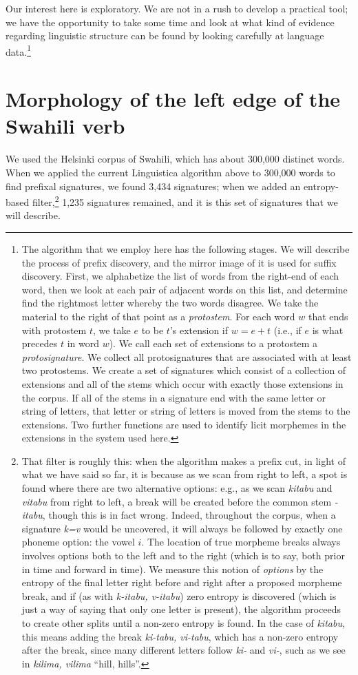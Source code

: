 \documentclass[output=paper,colorlinks,citecolor=brown]{langscibook}
\begin{document}
Our interest here is exploratory. We are not in a rush to develop a practical tool; we have the opportunity to take some time and look at what kind of evidence regarding linguistic structure can be found by looking carefully at language data.\footnote{The algorithm that we employ here has the following stages. We will describe the process of prefix discovery, and the mirror image of it is used for suffix discovery. First, we alphabetize the list of words from the right-end of each word, then we look at each pair of adjacent words on this list, and determine find the rightmost letter whereby the two words disagree. We take the material to the right of that point as a \textit{protostem}. For each word $w$ that ends with protostem $t$, we take $e$ to be $t$'s extension if $w=e+t$ (i.e., if $e$ is what precedes $t$ in word $w$). We call each set of extensions to a protostem a \textit{protosignature}. We collect all protosignatures that are associated with at least two protostems. We create a set of signatures which consist of a collection of extensions and all of the stems which occur with exactly those extensions in the corpus. If all of the stems in a signature end with the same letter or string of letters, that letter or string of letters is moved from the stems to the extensions. Two further functions are used to identify licit morphemes in the extensions in the system used here.}


\section{Morphology of the left edge of the Swahili verb}

We used the Helsinki corpus of Swahili, which has about 300,000 distinct words. When we applied the current Linguistica algorithm above to 300,000 words to find prefixal signatures, we found 3,434 signatures; when we added an entropy-based filter,\footnote{That filter is roughly this: when the algorithm makes a prefix cut, in light of what we have said so far, it is because as we scan from right to left, a spot is found where there are two alternative options: e.g., as we scan \textit{kitabu} and \textit{vitabu} from right to left, a break will be created before {the common stem \textit{-itabu}, though this is in fact wrong. Indeed, throughout the corpus, when a signature \textit{k=v} would be uncovered, it will always be followed by exactly one phoneme option: the vowel $i$. The location of true morpheme breaks always involves options both to the left and to the right (which is to say, both prior in time and forward in time). We measure this notion of \textit{options} by the entropy of the final letter right before and right after a proposed morpheme break, and if (as with \textit{k-itabu, v-itabu}) zero entropy is discovered (which is just a way of saying that only one letter is present), the algorithm proceeds to create other splits until a non-zero entropy is found. In the case of \textit{kitabu}, this means adding the break \textit{ki-tabu, vi-tabu}, which has a non-zero entropy after the break, since many different letters follow \textit{ki-} and \textit{vi-}, such as we see in \textit{kilima, vilima} ``hill, hills''.}}  1,235 signatures remained, and it is this set of signatures that we will describe.  
\end{document}
